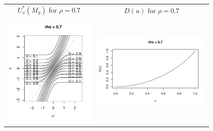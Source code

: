\documentclass[twoside,11pt]{article}
\newenvironment{myfont}{\fontfamily{phv}\selectfont}{\par}
\begin{document}
\begin{figure}[p]
\centering
\begin{tabular}{cc}
\begin{myfont}$U_x^*(M_y)$ for $\rho=0.7$\end{myfont}
&
\begin{myfont}$D(u)$ for $\rho = 0.7$\end{myfont}\\
\includegraphics[scale = 0.6, clip = true, trim = 0.1in 0 0 0.8in]{illus_ufunc_0_7.pdf} &
\includegraphics[scale = 0.6, clip = true, trim = 0.22in -0.3in 0 0.5in]{illus_kfunc_0_7.pdf}
\end{tabular}


\end{figure}
\end{document}

